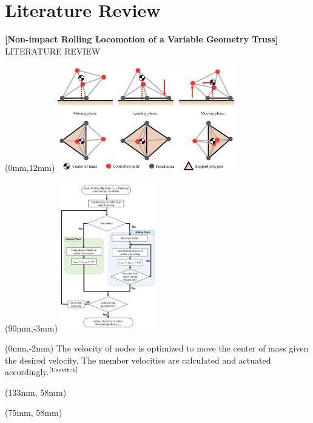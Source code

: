 \documentclass[11pt,aspectratio=169]{beamer}
\begin{document}
\section{Literature Review}

\begin{frame}[fragile]{\fontsize{10}{10}\selectfont\textbf{[Non-impact Rolling Locomotion of a Variable Geometry Truss]} \hfill \fontsize{8}{8}\selectfont LITERATURE REVIEW \newline [2019]}
    
        \begin{textblock*}{5cm}(0mm,12mm) %
        \includegraphics[height=46mm]{elements/[8]-LOCO.png}
        \end{textblock*}

        \begin{textblock*}{5cm}(90mm,-3mm) %
        \includegraphics[height=65mm]{elements/[10]-LOCO.png}
        \end{textblock*}

        \begin{textblock*}{87mm}(0mm,-2mm)
        The velocity of nodes is optimized to move the center of mass given the desired velocity. The member velocities are calculated and actuated accordingly.$^{\text{\cite{Usevitch}}}$
        \end{textblock*}

        \begin{textblock*}{5cm}(133mm, 58mm) %
        {\tiny \cite{8610002}}
        \end{textblock*}

        \begin{textblock*}{5cm}(75mm, 58mm) %
        {\tiny \cite{bb}}
        \end{textblock*}
        
        \vspace{52mm}
\end{frame}
\end{document}
